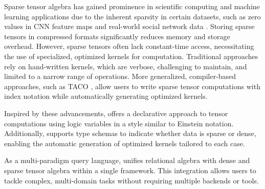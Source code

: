 \documentclass[acmsmall,nonacm]{acmart}\settopmatter{printfolios=true,printccs=false,printacmref=false}
\newcommand{\rhyme}{\text{Rhyme}\xspace}
\begin{document}
Sparse tensor algebra has gained prominence in scientific computing and machine learning applications due to the inherent sparsity in certain datasets, such as zero values in CNN feature maps \cite{cnnsparse, cnnsparse1, cnnsparse2} and real-world social network data \cite{facebookactivity, netflixprize, amazonreward}. Storing sparse tensors in compressed formats \cite{sparseformat} significantly reduces memory and storage overhead. However, sparse tensors often lack constant-time access, necessitating the use of specialized, optimized kernels for computation. Traditional approaches rely on hand-written kernels, which are verbose, challenging to maintain, and limited to a narrow range of operations. More generalized, compiler-based approaches, such as TACO \cite{tacotools, taco, indexedstream}, allow users to write sparse tensor computations with index notation while automatically generating optimized kernels.

Inspired by these advancements, \rhyme offers a declarative approach to tensor computations using logic variables in a style similar to Einstein notation. Additionally, \rhyme supports type schemas to indicate whether data is sparse or dense, enabling the automatic generation of optimized kernels tailored to each case.

As a multi-paradigm query language, \rhyme unifies relational algebra with dense and sparse tensor algebra within a single framework. This integration allows users to tackle complex, multi-domain tasks without requiring multiple backends or tools.\par
\end{document}
